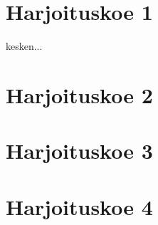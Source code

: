 \section{Harjoituskoe 1}

kesken...

\section{Harjoituskoe 2}


\section{Harjoituskoe 3}


\section{Harjoituskoe 4}
